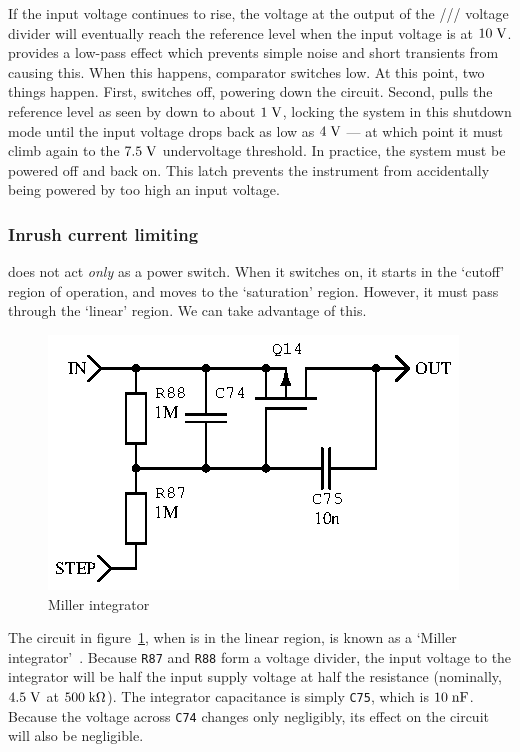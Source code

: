 If the input voltage continues to rise, the voltage at the output of the
/// voltage divider will
eventually reach the reference level when the input voltage is at $10\;\mathrm{V}$.
 provides a low-pass effect which prevents simple noise and short
transients from causing this. When this happens, comparator 
switches low. At this point, two things happen. First,  switches
 off, powering down the circuit. Second,  pulls the
reference level as seen by  down to about $1\;\mathrm{V}$, locking
the system in this shutdown mode until the input voltage drops back as low
as $4\;\mathrm{V}$ --- at which point it must climb again to the $7.5\;\mathrm{V}$
undervoltage threshold. In practice, the system must be powered off and back
on. This latch prevents the instrument from accidentally being powered by
too high an input voltage.

\subsubsection{Inrush current limiting}

 does not act \emph{only} as a power switch. When it switches on,
it starts in the `cutoff' region of operation, and moves to the `saturation'
region. However, it must pass through the `linear' region. We can take
advantage of this.

\begin{figure}[H]
\centering
\includegraphics[]{millerint}
\caption{Miller integrator}
\label{fig:miller}
\end{figure}

The circuit in figure~\ref{fig:miller}, when  is in the linear
region, is known as a `Miller integrator'~\cite[pg. 283]{tranckts-sawtooth}.
Because \texttt{R87} and \texttt{R88} form a voltage divider, the input
voltage to the integrator will be half the input supply voltage at half
the resistance (nominally, $4.5\;\mathrm{V}$ at $500\;\mathrm{k\Omega}$). The
integrator capacitance is simply \texttt{C75}, which is $10\;\mathrm{nF}$.
Because the voltage across \texttt{C74} changes only negligibly, its effect
on the circuit will also be negligible.


